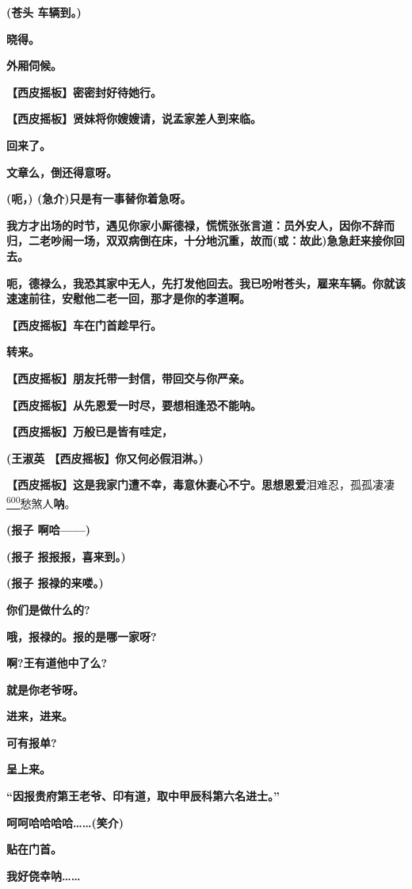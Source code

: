 \textbf{(苍头 车辆到。)}

\textbf{晓得。}

\textbf{外厢伺候。}

\textbf{【西皮摇板】密密封好待她行。}

\textbf{【西皮摇板】贤妹将你嫂嫂请，说孟家差人到来临。}

\textbf{回来了。}

\textbf{文章么，倒还得意呀。}

\textbf{(呃，) (急介)只是有一事替你着急呀。}

\textbf{我方才出场的时节，遇见你家小厮德禄，慌慌张张言道：员外安人，因你不辞而归，二老吵闹一场，双双病倒在床，十分地沉重，故而(或：故此)急急赶来接你回去。}

\textbf{呃，德禄么，我恐其家中无人，先打发他回去。我已吩咐苍头，雇来车辆。你就该速速前往，安慰他二老一回，那才是你的孝道啊。}

\textbf{【西皮摇板】车在门首趁早行。}

\textbf{转来。}

\textbf{【西皮摇板】朋友托带一封信，带回交与你严亲。}

\textbf{【西皮摇板】从先恩爱一时尽，要想相逢恐不能呐。}

\textbf{【西皮摇板】万般已是皆有哇定，}

\textbf{(王淑英 【西皮摇板】你又何必假泪淋。)}

\textbf{【西皮摇板】这是我家门遭不幸，毒意休妻心不宁。思想恩爱}泪难忍，孤孤凄凄\protect\hyperlink{fn600}{\textsuperscript{600}}愁煞人\textbf{呐}。

\textbf{(报子 啊哈------)}

\textbf{(报子 报报报，喜来到。)}

\textbf{(报子 报禄的来喽。)}

\textbf{你们是做什么的?}

\textbf{哦，报禄的。报的是哪一家呀?}

\textbf{啊?王有道他中了么?}

\textbf{就是你老爷呀。}

\textbf{进来，进来。}

\textbf{可有报单?}

\textbf{呈上来。}

\textbf{``因报贵府第王老爷、印有道，取中甲辰科第六名进士。''}

\textbf{呵呵哈哈哈哈\ldots{}\ldots{}(笑介)}

\textbf{贴在门首。}

\textbf{我好侥幸呐\ldots{}\ldots{}}

